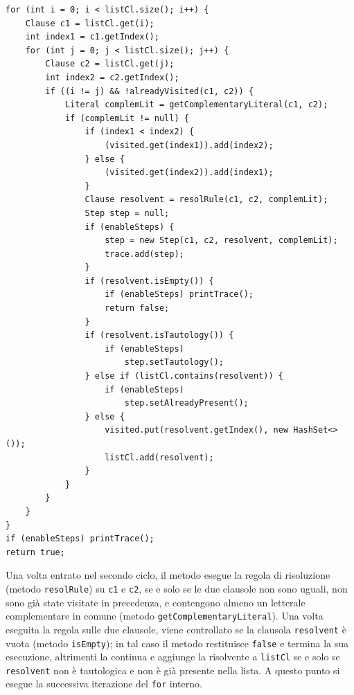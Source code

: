 \documentclass[a4paper,12pt]{report}
\begin{document}
\begin{minipage}{\linewidth}
\small 
\begin{lstlisting}[caption={Esecuzione dei cicli \texttt{for} innestati, all'interno del metodo \texttt{isSatisfiable} della classe \texttt{Resolution}}, label={double-for}]
for (int i = 0; i < listCl.size(); i++) {
    Clause c1 = listCl.get(i);
    int index1 = c1.getIndex();
    for (int j = 0; j < listCl.size(); j++) {
        Clause c2 = listCl.get(j);
        int index2 = c2.getIndex();
        if ((i != j) && !alreadyVisited(c1, c2)) {
            Literal complemLit = getComplementaryLiteral(c1, c2);
            if (complemLit != null) {
                if (index1 < index2) {
                    (visited.get(index1)).add(index2);
                } else {
                    (visited.get(index2)).add(index1);
                }
                Clause resolvent = resolRule(c1, c2, complemLit);
                Step step = null;
                if (enableSteps) {
                    step = new Step(c1, c2, resolvent, complemLit);
                    trace.add(step);
                }
                if (resolvent.isEmpty()) {
                    if (enableSteps) printTrace();
                    return false;
                } 
                if (resolvent.isTautology()) {
                    if (enableSteps)
                        step.setTautology();
                } else if (listCl.contains(resolvent)) {
                    if (enableSteps)
                        step.setAlreadyPresent();
                } else {
                    visited.put(resolvent.getIndex(), new HashSet<>());
                    listCl.add(resolvent);
                }
            }
        }
    }
}
if (enableSteps) printTrace();
return true;
\end{lstlisting}
\end{minipage}
Una volta entrato nel secondo ciclo, il metodo esegue la regola di risoluzione (metodo \texttt{resolRule}) su \texttt{c1} e \texttt{c2}, se e solo se le due clausole non sono uguali, non sono già state visitate in precedenza, e contengono almeno un letterale complementare in comune (metodo \texttt{getComplementaryLiteral}). Una volta eseguita la regola sulle due clausole, viene controllato se la clausola \texttt{resolvent} è vuota (metodo \texttt{isEmpty}); in tal caso il metodo restituisce \texttt{false} e termina la sua esecuzione, altrimenti la continua e aggiunge la risolvente a \texttt{listCl} se e solo se \texttt{resolvent} non è tautologica e non è già presente nella lista. A questo punto si esegue la successiva iterazione del \texttt{for} interno.
\end{document}
